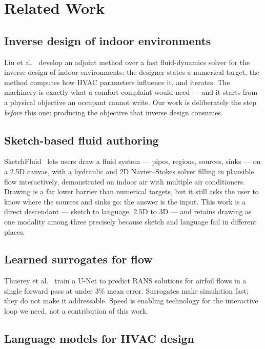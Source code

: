 \documentclass[manuscript,review,anonymous]{acmart}
\begin{document}
\section{Related Work}

\subsection{Inverse design of indoor environments}

Liu et al.~\cite{liu2017inverse} develop an adjoint method over a fast
fluid-dynamics solver for the inverse design of indoor environments: the
designer states a numerical target, the method computes how HVAC parameters
influence it, and iterates. The machinery is exactly what a comfort complaint
would need --- and it starts from a physical objective an occupant cannot write.
Our work is deliberately the step \emph{before} this one: producing the
objective that inverse design consumes.

\subsection{Sketch-based fluid authoring}

SketchFluid~\cite{zhu2011sketchfluid} lets users draw a fluid system --- pipes,
regions, sources, sinks --- on a 2.5D canvas, with a hydraulic and 2D
Navier--Stokes solver filling in plausible flow interactively, demonstrated on
indoor air with multiple air conditioners. Drawing is a far lower barrier than
numerical targets, but it still asks the user to know where the sources and
sinks go: the answer is the input. This work is a direct descendant --- sketch
to language, 2.5D to 3D --- and retains drawing as one modality among three
precisely because sketch and language fail in different places.

\subsection{Learned surrogates for flow}

Thuerey et al.~\cite{thuerey2020deep} train a U-Net to predict RANS solutions
for airfoil flows in a single forward pass at under 3\% mean error. Surrogates
make simulation fast; they do not make it addressable. Speed is enabling
technology for the interactive loop we need, not a contribution of this work.

\subsection{Language models for HVAC design}
\end{document}
